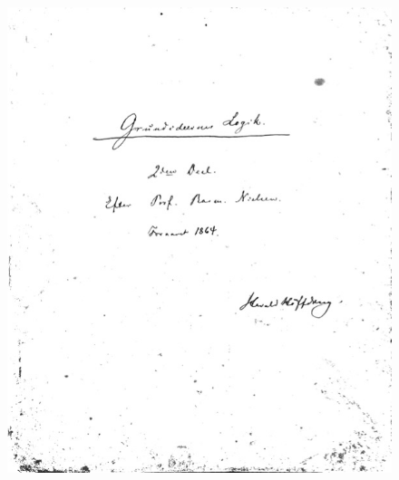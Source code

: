 \documentclass[ignorenonframetext, ]{beamer}
\begin{document}
\begin{frame}

\begin{figure}
\centering
\includegraphics[scale=0.4]{høffding1.jpg}
\end{figure}

\end{frame}
\end{document}
